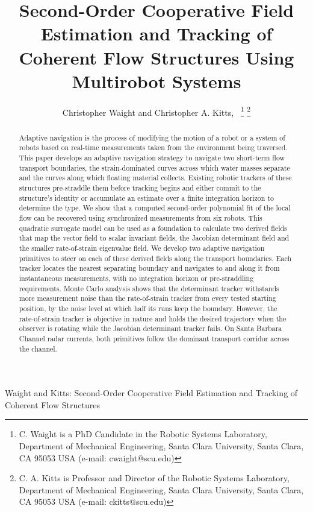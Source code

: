 \documentclass[lettersize,journal]{IEEEtran}
\begin{document}
\title{Second-Order Cooperative Field Estimation and Tracking of Coherent Flow Structures Using Multirobot Systems}

\author{Christopher Waight and Christopher A. Kitts,~
\thanks{C. Waight is a PhD Candidate in the Robotic Systems Laboratory, Department of Mechanical Engineering, Santa Clara University, Santa Clara, CA 95053 USA (e-mail: cwaight@scu.edu)}
\thanks{C. A. Kitts is Professor and Director of the Robotic Systems Laboratory, Department of Mechanical Engineering, Santa Clara University, Santa Clara, CA 95053 USA (e-mail: ckitts@scu.edu)}
}
%
{Waight and Kitts: Second-Order Cooperative Field Estimation and Tracking of Coherent Flow Structures}

\maketitle

\begin{abstract}
Adaptive navigation is the process of modifying the motion of a robot or a system of robots based on 
real-time measurements taken from the environment being traversed. This paper 
develops an adaptive navigation strategy to navigate two short-term flow transport boundaries, the strain-dominated
curves across which water masses separate and the curves along which floating material collects.
Existing robotic trackers of these structures pre-straddle them before tracking begins and either commit to the structure's
identity or accumulate an estimate over a finite integration horizon to determine the type.
We show that a computed second-order polynomial fit of the local flow can be recovered using synchronized measurements from six robots.
This quadratic surrogate model can be used as a foundation to calculate two derived fields that map the vector field to scalar invariant fields, the Jacobian determinant field and the smaller rate-of-strain eigenvalue field.
We develop two adaptive navigation primitives to steer on each of these derived fields along the transport boundaries. Each tracker locates the nearest separating boundary
and navigates to and along it from instantaneous measurements, with no integration horizon or pre-straddling requirements.
Monte Carlo analysis shows that the determinant tracker withstands more measurement noise than the rate-of-strain tracker from every tested starting position, by the noise level at which half its runs keep the boundary.
However, the rate-of-strain tracker is objective in nature and holds the desired trajectory when the observer is rotating while the Jacobian determinant tracker fails.
On Santa Barbara Channel radar currents, both primitives follow the dominant transport corridor across the channel.

\end{abstract}
\end{document}
